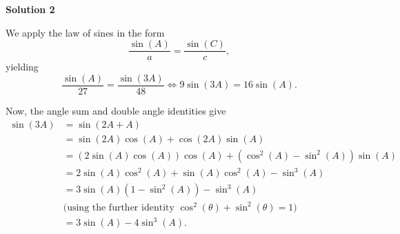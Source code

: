\begin{enumerate}
\textbf{Solution 2}

We apply the law of sines in the form 
 \[\frac{\sin(A)}{a} = \frac{\sin(C)}{c},\] yielding 
 \[\frac{\sin(A)}{27} = \frac{\sin(3A)}{48} \iff 9\sin(3A) = 16\sin(A).\]

 Now, the angle sum and double angle identities give 
 \begin{align*}\sin(3A) &= \sin(2A+A) \\ &= \sin(2A)\cos(A)+\cos(2A)\sin(A) \\ &= \left(2\sin(A)\cos(A)\right)\cos(A)+\left(\cos^2(A)-\sin^2(A)\right)\sin(A) \\ &= 2\sin(A)\cos^2(A)+\sin(A)\cos^2(A)-\sin^3(A) \\ &= 3\sin(A)\left(1-\sin^2(A)\right)-\sin^3(A) \\ &\text{(using the further identity } \cos^2(\theta)+\sin^2(\theta) = 1\text{)} \\ &= 3\sin(A)-4\sin^3(A).\end{align*}



\end{enumerate}
